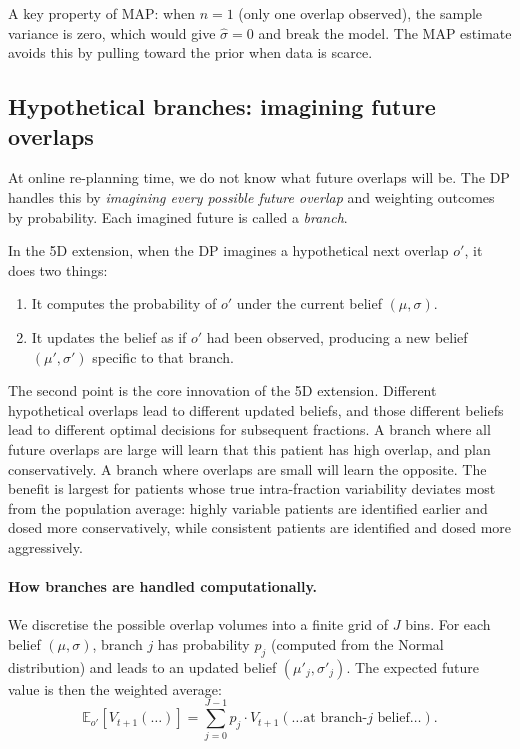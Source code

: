 \documentclass[11pt]{article}
\theoremstyle{definition}
\begin{document}
A key property of MAP: when $n = 1$ (only one overlap observed), the
sample variance is zero, which would give $\hat\sigma = 0$ and break the
model.  The MAP estimate avoids this by pulling toward the prior when data
is scarce.

\subsection{Hypothetical branches: imagining future overlaps}
\label{sec:branches_intro}

At online re-planning time, we do not know what future overlaps will be.  The DP
handles this by \emph{imagining every possible future overlap} and weighting
outcomes by probability.  Each imagined future is called a \emph{branch}.

In the 5D extension, when the DP imagines a hypothetical
next overlap $o'$, it does two things:
\begin{enumerate}
  \item It computes the probability of $o'$ under the current belief
        $(\mu, \sigma)$.
  \item It updates the belief as if $o'$ had been observed, producing
        a new belief $(\mu', \sigma')$ specific to that branch.
\end{enumerate}

The second point is the core innovation of the 5D extension.  Different hypothetical
overlaps lead to different updated beliefs, and those different beliefs lead
to different optimal decisions for subsequent fractions.  A branch where all
future overlaps are large will learn that this patient has high overlap, and
plan conservatively.  A branch where overlaps are small will learn the
opposite.  The benefit is largest for patients whose true intra-fraction
variability deviates most from the population average: highly variable
patients are identified earlier and dosed more conservatively, while
consistent patients are identified and dosed more aggressively.

\paragraph{How branches are handled computationally.}
We discretise the possible overlap volumes into a finite grid of $J$ bins.  For each
belief $(\mu, \sigma)$, branch $j$ has probability $p_j$ (computed from the
Normal distribution) and leads to an updated belief $(\mu'_j, \sigma'_j)$.
The expected future value is then the weighted average:
\[
  \mathbb{E}_{o'}\!\left[V_{t+1}(\ldots)\right]
  = \sum_{j=0}^{J-1} p_j \cdot V_{t+1}(\ldots\text{at branch-}j\text{ belief}\ldots).
\]
\end{document}
